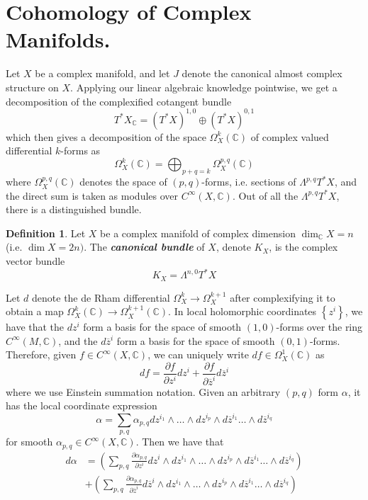 \documentclass[psamsfonts, 12pt]{amsart}
\theoremstyle{definition}
\newtheorem{defn}[thm]{Definition}
\theoremstyle{remark}
\newcommand{\ib}[1]{\textbf{\textit{#1}}}
\newcommand{\C}{\mathbb{C}}
\newcommand{\set}[1]{\left\lbrace #1 \right\rbrace}
\begin{document}
\section{Cohomology of Complex Manifolds.}
%
Let $X$ be a complex manifold, and let $J$ denote the canonical almost complex structure
on $X$. Applying our linear algebraic knowledge pointwise, we get a decomposition of
the complexified cotangent bundle
\[
T^*X_\C = (T^*X)^{1,0} \oplus (T^*X)^{0,1}
\]
%
which then gives a decomposition of the space $\Omega^k_X(\C)$ of complex valued
differential $k$-forms as
\[
\Omega^k_X(\C) = \bigoplus_{p+q=k}\Omega^{p,q}_X(\C)
\]
where $\Omega^{p,q}_X(\C)$ denotes the space of $(p,q)$-forms, i.e. sections of
$\Lambda^{p,q}T^*X$, and the direct sum is taken as modules over $C^\infty(X,\C)$.
Out of all the $\Lambda^{p,q}T^*X$, there is a distinguished bundle.
%
\begin{defn}
Let $X$ be a complex manifold of complex dimension $\dim_\C X = n$ (i.e. $\dim X = 2n)$.
The \ib{canonical bundle} of $X$, denote $K_X$, is the complex vector bundle
\[
K_X = \Lambda^{n,0}T^*X
\]
\end{defn}
%
Let $d$ denote the de Rham differential $\Omega^k_X \to \Omega^{k+1}_X$ after
complexifying it to obtain a map $\Omega^k_X(\C) \to \Omega^{k+1}_X(\C)$. In local
holomorphic coordinates $\set{z^i}$, we have that the $dz^i$ form a basis for the space
of smooth $(1,0)$-forms over the ring $C^\infty(M,\C)$, and the $d\overline{z}^i$ form a
basis for the space of smooth $(0,1)$-forms. Therefore, given $f \in C^\infty(X,\C)$, we
can uniquely write $df \in \Omega^1_X(\C)$ as
\[
df = \frac{\partial f}{\partial z^i}dz^i +
\frac{\partial f}{\partial\overline{z}^i}d\overline{z}^i
\]
where we use Einstein summation notation. Given an arbitrary $(p,q)$ form $\alpha$, it
has the local coordinate expression
\[
\alpha = \sum_{p,q} \alpha_{p,q} dz^{i_1} \wedge \ldots \wedge dz^{i_p} \wedge
d\overline{z}^{i_1}\ldots \wedge d\overline{z}^{i_q}
\]
for smooth $\alpha_{p,q} \in C^\infty(X,\C)$. Then we have that
%
\begin{align*}
d\alpha &= \left(\sum_{p,q}\frac{\partial\alpha_{p,q}}{\partial z^i} dz^i
\wedge dz^{i_1} \wedge \ldots \wedge dz^{i_p} \wedge
d\overline{z}^{i_1}\ldots \wedge d\overline{z}^{i_q}\right) \\[5pt]
&+ \left(
\sum_{p,q}\frac{\partial\alpha_{p,q}}{\partial \overline{z}^i} d\overline{z}^i
\wedge dz^{i_1} \wedge \ldots \wedge dz^{i_p} \wedge
d\overline{z}^{i_1}\ldots \wedge d\overline{z}^{i_q}
\right)
\end{align*}
\end{document}
